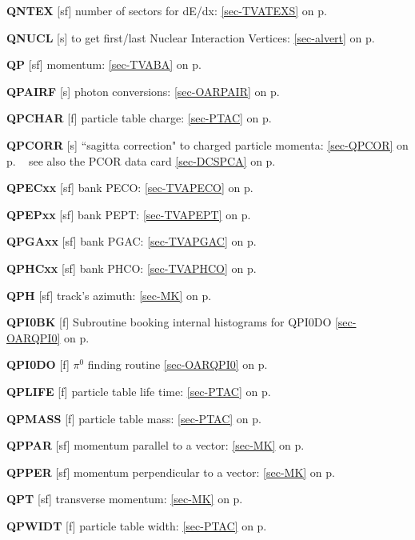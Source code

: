  \item{\bf QNTEX   }[sf] number of sectors for dE/dx: \ref{sec-TVATEXS} on p.~\pageref{sec-TVATEXS} \\
 \item{\bf QNUCL   }[s] to get first/last Nuclear Interaction Vertices: \ref{sec-alvert} on p.~\pageref{sec-alvert}\\
 \item{\bf QP      }[sf] momentum: \ref{sec-TVABA} on p.~\pageref{sec-TVABA}\\
 \item{\bf QPAIRF  }[s] photon conversions: \ref{sec-OARPAIR} on
 p.~\pageref{sec-OARPAIR}\\
 \item{\bf QPCHAR  }[f] particle table charge: \ref{sec-PTAC} on p.~\pageref{sec-PTAC}\\
 \item{\bf QPCORR  }[s] ``sagitta correction" to charged particle momenta: \ref{sec-QPCOR} on p.
 ~\pageref{sec-QPCOR}
 see also the PCOR data card \ref{sec-DCSPCA} on p.~\pageref{sec-DCSPCA}   \\
 \item{\bf QPECxx  }[sf] bank PECO: \ref{sec-TVAPECO} on p.~\pageref{sec-TVAPECO}\\
 \item{\bf QPEPxx  }[sf] bank PEPT: \ref{sec-TVAPEPT} on p.~\pageref{sec-TVAPEPT}\\
 \item{\bf QPGAxx  }[sf] bank PGAC: \ref{sec-TVAPGAC} on p.~\pageref{sec-TVAPGAC}\\
 \item{\bf QPHCxx  }[sf] bank PHCO: \ref{sec-TVAPHCO} on p.~\pageref{sec-TVAPHCO}\\
 \item{\bf QPH     }[sf] track's azimuth: \ref{sec-MK} on p.~\pageref{sec-MK}\\
 \item{\bf QPI0BK  }[f] Subroutine booking internal histograms for QPI0DO
 \ref{sec-OARQPI0} on p.~\pageref{sec-OARQPI0}\\
 \item{\bf QPI0DO  }[f] $\pi^0$ finding routine
 \ref{sec-OARQPI0} on p.~\pageref{sec-OARQPI0}\\
 \item{\bf QPLIFE  }[f] particle table life time: \ref{sec-PTAC} on p.~\pageref{sec-PTAC}\\
 \item{\bf QPMASS  }[f] particle table mass: \ref{sec-PTAC} on p.~\pageref{sec-PTAC}\\
 \item{\bf QPPAR   }[sf] momentum parallel to a vector: \ref{sec-MK} on p.~\pageref{sec-MK}\\
 \item{\bf QPPER   }[sf] momentum perpendicular to a vector: \ref{sec-MK} on p.~\pageref{sec-MK}\\
 \item{\bf QPT     }[sf] transverse momentum: \ref{sec-MK} on p.~\pageref{sec-MK}\\
 \item{\bf QPWIDT  }[f] particle table width: \ref{sec-PTAC} on p.~\pageref{sec-PTAC}
 
